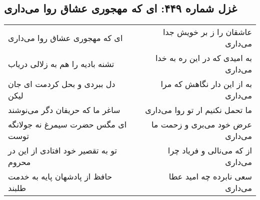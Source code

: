 \begin{center}
\section*{غزل شماره ۴۴۹: ای که مهجوری عشاق روا می‌داری}
\label{sec:sh449}
\begin{longtable}{l p{0.5cm} r}
ای که مهجوری عشاق روا می‌داری
&&
عاشقان را ز بر خویش جدا می‌داری
\\
تشنه بادیه را هم به زلالی دریاب
&&
به امیدی که در این ره به خدا می‌داری
\\
دل ببردی و بحل کردمت ای جان لیکن
&&
به از این دار نگاهش که مرا می‌داری
\\
ساغر ما که حریفان دگر می‌نوشند
&&
ما تحمل نکنیم ار تو روا می‌داری
\\
ای مگس حضرت سیمرغ نه جولانگه توست
&&
عرض خود می‌بری و زحمت ما می‌داری
\\
تو به تقصیر خود افتادی از این در محروم
&&
از که می‌نالی و فریاد چرا می‌داری
\\
حافظ از پادشهان پایه به خدمت طلبند
&&
سعی نابرده چه امید عطا می‌داری
\\
\end{longtable}
\end{center}
